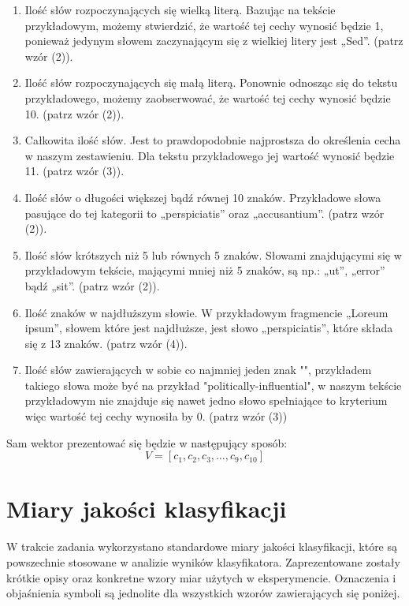 \documentclass{article}
\begin{document}
\begin{enumerate}
    \item Ilość słów rozpoczynających się wielką literą. Bazując na tekście przykładowym, możemy stwierdzić, że wartość tej cechy wynosić będzie 1, ponieważ jedynym słowem zaczynającym się z wielkiej litery jest „Sed”. (patrz wzór (2)).
    \item Ilość słów rozpoczynających się małą literą. Ponownie odnosząc się do tekstu przykładowego, możemy zaobserwować, że wartość tej cechy wynosić będzie 10. (patrz wzór (2)).
    \item Całkowita ilość słów. Jest to prawdopodobnie najprostsza do określenia cecha w naszym zestawieniu. Dla tekstu przykładowego jej wartość wynosić będzie 11. (patrz wzór (3)).
    \item Ilość słów o długości większej bądź równej 10 znaków. Przykładowe słowa pasujące do tej kategorii to „perspiciatis” oraz „accusantium”. (patrz wzór (2)).
    \item Ilość słów krótszych niż 5 lub równych 5 znaków. Słowami znajdującymi się w przykładowym tekście, mającymi mniej niż 5 znaków, są np.: „ut”, „error” bądź „sit”. (patrz wzór (2)).
    \item Ilość znaków w najdłuższym słowie. W przykładowym fragmencie „Loreum ipsum”, słowem które jest najdłuższe, jest słowo „perspiciatis”, które składa się z 13 znaków. (patrz wzór (4)).
    \item Ilość słów zawierających w sobie co najmniej jeden znak "\textendash", przykładem takiego słowa może być na przykład "politically-influential", w naszym tekście przykładowym nie znajduje się nawet jedno słowo spełniające to kryterium więc wartość tej cechy wynosiła by 0. (patrz wzór (3))
\end{enumerate}

Sam wektor prezentować się będzie w następujący sposób:
\[ V = [c_1,c_2,c_3, \ldots , c_9, c_{10}] \]




\section{Miary jakości klasyfikacji}

W trakcie zadania wykorzystano standardowe miary jakości klasyfikacji, które są powszechnie stosowane w analizie wyników klasyfikatora. Zaprezentowane zostały krótkie opisy oraz konkretne wzory miar użytych w eksperymencie. Oznaczenia i objaśnienia symboli są jednolite dla wszystkich wzorów zawierających się poniżej.
\end{document}
